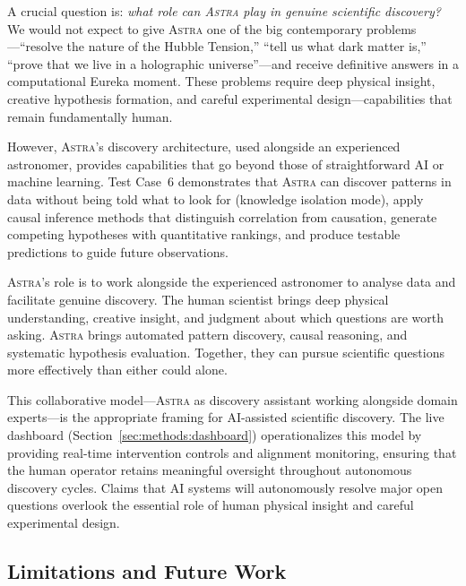 \documentclass[usenatbib]{rasti}
\newcommand{\astra}{\textsc{Astra}\xspace}
\begin{document}
A crucial question is: \emph{what role can \astra play in genuine scientific discovery?}
We would not expect to give \astra one of the big contemporary problems---``resolve the nature of the Hubble Tension,'' ``tell us what dark matter is,'' ``prove that we live in a holographic universe''---and receive definitive answers in a computational Eureka moment.
These problems require deep physical insight, creative hypothesis formation, and careful experimental design---capabilities that remain fundamentally human.

However, \astra's discovery architecture, used alongside an experienced astronomer, provides capabilities that go beyond those of straightforward AI or machine learning.
Test Case~6 demonstrates that \astra can discover patterns in data without being told what to look for (knowledge isolation mode), apply causal inference methods that distinguish correlation from causation, generate competing hypotheses with quantitative rankings, and produce testable predictions to guide future observations.

\astra's role is to work alongside the experienced astronomer to analyse data and facilitate genuine discovery.
The human scientist brings deep physical understanding, creative insight, and judgment about which questions are worth asking.
\astra brings automated pattern discovery, causal reasoning, and systematic hypothesis evaluation.
Together, they can pursue scientific questions more effectively than either could alone.

This collaborative model---\astra as discovery assistant working alongside domain experts---is the appropriate framing for AI-assisted scientific discovery.
The live dashboard (Section~\ref{sec:methods:dashboard}) operationalizes this model by providing real-time intervention controls and alignment monitoring, ensuring that the human operator retains meaningful oversight throughout autonomous discovery cycles.
Claims that AI systems will autonomously resolve major open questions overlook the essential role of human physical insight and careful experimental design.

\subsection{Limitations and Future Work}
\label{sec:discussion:limitations}
\end{document}
